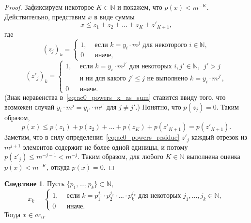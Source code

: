 \documentclass[a4paper,openbib]{article}
\renewcommand{\leq}{\leqslant}
\theoremstyle{definition}
\newtheorem{corollary}{Следствие}[lemma]
\begin{document}
\begin{proof}
	Зафиксируем некоторое $K \in \mathbb{N}$ и покажем, что $p(x) < m^{-K}$.
	Действительно, представим $x$ в виде суммы
	\begin{equation}
		\label{eq:ac0_powers_x_as_sum}
		x \leq z_1 + z_2 + \dots + z_K + z'_{K+1}
		,
	\end{equation}
	где
	\begin{equation}
		(z_j)_k = \begin{cases}
			1, &\mbox{~если~} k = y_i \cdot m^j \mbox{~для некоторого~} i\in\mathbb{N},
			\\
			0  &\mbox{~иначе}
			,
		\end{cases}
	\end{equation}
	\begin{equation}
		\label{eq:ac0_powers_residue}
		(z'_j)_k = \begin{cases}
			1, &\mbox{~если~} k = y_i \cdot m^{j'} \mbox{~для некоторых~} i,j'\in\mathbb{N},~~ j' > j
			\\ &\mbox{~и ни для какого~} j' \leq j \mbox{~не выполнено~} k = y_i \cdot m^{j'},
			\\
			0  &\mbox{~иначе}
			.
		\end{cases}
	\end{equation}
	(Знак неравенства в~\eqref{eq:ac0_powers_x_as_sum} ставится ввиду того, что возможен случай
	$y_i \cdot m^j = y_{i'} \cdot m^{j'}$ для $j\neq j'$.)
	Понятно, что $p(z_j)=0$.
	Таким образом,
	\begin{equation}
		p(x) \leq p(z_1) + p(z_2) + \dots + p(z_K) + p(z'_{K+1}) = p(z'_{K+1})
		.
	\end{equation}
	Заметим, что в силу определения~\eqref{eq:ac0_powers_residue} $z'_j$ каждый отрезок из $m^{j+1}$ элементов
	содержит не более одной единицы, и потому $p(z'_j) \leq m^{-j-1} < m^{-j}$.
	Таким образом, для любого $K\in\mathbb{N}$ выполнена оценка $p(x) < m^{-K}$,
	откуда $p(x) = 0$.
\end{proof}

\begin{corollary}
	\label{cor:ac0_powers_finite_set_of_numbers}
	Пусть $\{p_1, ..., p_k\} \subset \mathbb{N}$,
	\begin{equation}
		x_k = \begin{cases}
			1, &\mbox{~если~} k = p_1^{j_1}\cdot p_2^{j_2}\cdot ... \cdot p_k^{j_k} \mbox{~для некоторых~} j_1,...,j_k\in\mathbb{N},
			\\
			0  &\mbox{~иначе}.
		\end{cases}
	\end{equation}
	Тогда $x\in ac_0$.
\end{corollary}
\end{document}
